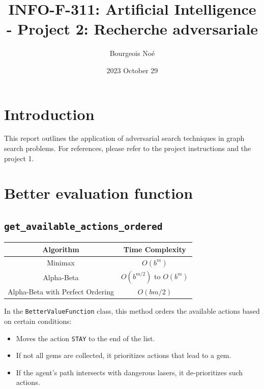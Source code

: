 \documentclass{article}
\title{INFO-F-311: Artificial Intelligence - Project 2: Recherche adversariale}
\author{Bourgeois Noé}
\date{2023 October 29}
\begin{document}
\maketitle

\tableofcontents

\newpage
\section{Introduction}
This report outlines the application of adversarial search techniques in graph search problems. 
For references, please refer to the project instructions and the project 1.

\section{Better evaluation function}

\subsection{\texttt{get\_available\_actions\_ordered}}
\begin{center}
    \begin{tabular}{|c|c|}
    \hline
    Algorithm & Time Complexity \\
    \hline
    Minimax & \( O(b^m) \) \\
    \hline
    Alpha-Beta & \( O(b^{m/2}) \) to \( O(b^m) \) \\
    \hline
    Alpha-Beta with Perfect Ordering & \( O(bm/2) \) \\
    \hline
    \end{tabular}
    \end{center}
    
    \vspace{1em} %
    

In the \texttt{BetterValueFunction} class, this method orders the available actions based on certain conditions:

\begin{itemize}
    \item Moves the action \texttt{STAY} to the end of the list.
    \item If not all gems are collected, it prioritizes actions that lead to a gem.
    \item If the agent's path intersects with dangerous lasers, it de-prioritizes such actions.
\end{itemize}
\end{document}
